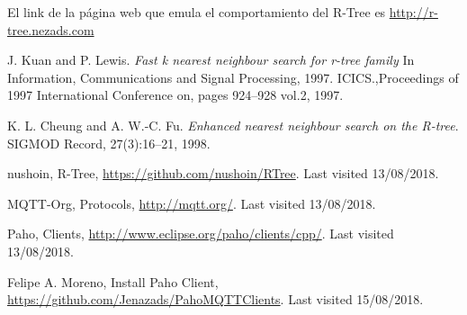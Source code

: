 \documentclass[a4paper]{article}
\begin{document}
El link de la página web que emula el comportamiento del R-Tree es \url{http://r-tree.nezads.com}

\begin{thebibliography}{9}
J. Kuan and P. Lewis. \textit{Fast k nearest neighbour search for r-tree family} In Information, Communications and Signal Processing, 1997. ICICS.,Proceedings of 1997 International Conference on, pages 924–928 vol.2, 1997.

K. L. Cheung and A. W.-C. Fu. \textit{Enhanced nearest neighbour search on the R-tree}. SIGMOD Record,
27(3):16–21, 1998.

nushoin, R-Tree, \url{https://github.com/nushoin/RTree}. Last visited 13/08/2018.


MQTT-Org, Protocols, \url{http://mqtt.org/}. Last visited 13/08/2018.

Paho, Clients, \url{http://www.eclipse.org/paho/clients/cpp/}. Last visited 13/08/2018. 

Felipe A. Moreno, Install Paho Client, \url{https://github.com/Jenazads/PahoMQTTClients}. Last visited 15/08/2018.

\end{thebibliography}
\end{document}
